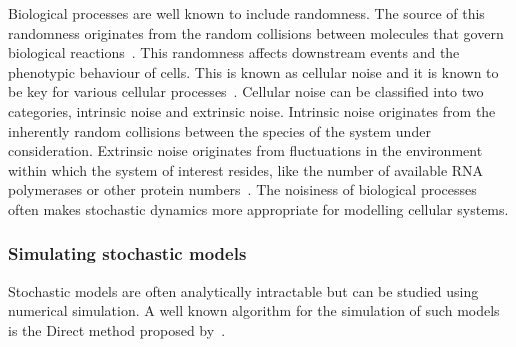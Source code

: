 Biological processes are well known to include randomness. The source of this randomness originates from the random collisions between molecules that govern biological reactions~\autocite{khamash_iglesias:2010}. This randomness affects downstream events and the phenotypic behaviour of cells. This is known as cellular noise and it is known to be key for various cellular processes~\autocite{Eldar:2010kk}. Cellular noise can be classified into two categories, intrinsic noise and extrinsic noise. Intrinsic noise originates from the inherently random collisions between the species of the system under consideration. Extrinsic noise originates from fluctuations in the environment within which the system of interest resides, like the number of available RNA polymerases or other protein numbers~\autocite{khamash_iglesias:2010}. The noisiness of biological processes often makes stochastic dynamics more appropriate for modelling cellular systems.  



\subsubsection{Simulating stochastic models}

Stochastic models are often analytically intractable but can be studied using numerical simulation. A well known algorithm for the simulation of such models is the Direct method proposed by~\textcite{Gillespie:1977ww}.



